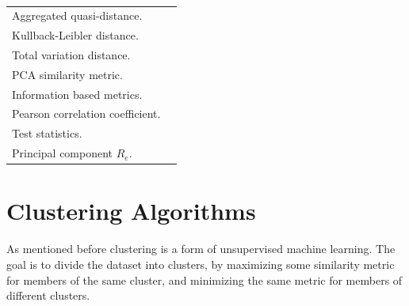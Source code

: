 \begin{table}[h]
\begin{tabular}{p{}p{}}
        Aggregated quasi-distance.          & \cite{BSLEX_nonlin_nonstat_tsc, } \\
        Kullback-Leibler distance.          & \cite{multivariate_tsc_hmm, } \\
        Total variation distance.           & \cite{tsc_total_variation_distance, } \\
        PCA similarity metric.              & \cite{wavelet_multivar_tsc_multi_pca} \\
        Information based metrics.          & \cite{dependency_tsc_energy_markets, } \\
        Pearson correlation coefficient.    & \cite{community_detection_networks_tsc, shape_feat_mod_tsc_rfa, fuzzy_c_means_pso_svd, } \\
        Test statistics.                    & \cite{fstar_hac_tsc, } \\
        Principal component $R_e$.          & \cite{multivariate_tsc_common_pca} \\
        \bottomrule
    \end{tabular}
    \caption{}
    \label{tab:}
\end{table}

\section{Clustering Algorithms}
As mentioned before clustering is a form of unsupervised machine learning. 
The goal is to divide the dataset into clusters, by maximizing some similarity metric for members of the same cluster, and minimizing the same metric for members of different clusters.


